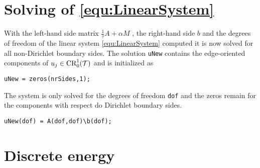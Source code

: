 \section{Solving of \ref{equ:LinearSystem}}
With the left-hand side matrix
$
 \frac{1}{\tau}A+\alpha M
$
, the right-hand side $b$ 
and the degrees of freedom of the linear system \ref{equ:LinearSystem} computed
it is now solved for all non-Dirichlet boundary sides.
The solution \texttt{uNew} contains the edge-oriented components of $u_j\in\textup{CR}^1_0(
\mathcal T)$ and is initialized as
\begin{lstlisting}[frame=single, numbers=none]
uNew = zeros(nrSides,1);
\end{lstlisting}
The system is only solved for the degrees of freedom \texttt{dof} and the zeros remain
for the components with respect do Dirichlet boundary sides.
\begin{lstlisting}[frame=single, numbers=none]
uNew(dof) = A(dof,dof)\b(dof);
\end{lstlisting}

\section{Discrete energy}

